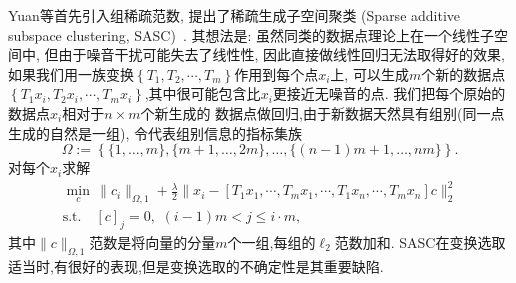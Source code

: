Yuan等首先引入组稀疏范数, 提出了稀疏生成子空间聚类
(Sparse additive subspace clustering, SASC)~\cite{yuan2014sparse}.
其想法是: 虽然同类的数据点理论上在一个线性子空间中,
但由于噪音干扰可能失去了线性性, 因此直接做线性回归无法取得好的效果,
如果我们用一族变换\(\left\{T_1, T_2, \cdots, T_m\right\}\)作用到每个点\(x_i\)上,
可以生成\(m\)个新的数据点\(\left\{ T_1 x_i, T_2 x_i,\cdots,
T_m x_i \right\}\),其中很可能包含比\(x_i\)更接近无噪音的点. 
我们把每个原始的数据点\(x_i\)相对于\(n\times m\)个新生成的
数据点做回归,由于新数据天然具有组别(同一点生成的自然是一组),
令代表组别信息的指标集族
\begin{equation*}
  \Omega:= \left\{ \{1,\ldots, m\}, \{m+1, \ldots, 2m\}, \ldots, \{(n-1)m+1,
  \ldots, nm\}\right\}.
\end{equation*}
对每个\(x_i\)求解
\begin{equation}
  \begin{gathered}
    \min_{c}\, \|c_i\|_{\Omega, 1}+\frac{\lambda}{2}\|x_i-\left[ 
      T_1 x_1, \cdots, T_m x_1,\cdots, T_1 x_n, \cdots, T_m x_n
    \right] c\|_2^2 \\
    \text{s.t.} \quad [c]_j = 0,\,\, (i-1)m < j \le i\cdot m,
  \end{gathered}
  \label{eq:sasc}
\end{equation}
其中\(\|c\|_{\Omega, 1}\)范数是将向量的分量\(m\)个一组,每组的\(\ell_2\)范数加和.
SASC在变换选取适当时,有很好的表现,但是变换选取的不确定性是其重要缺陷.
